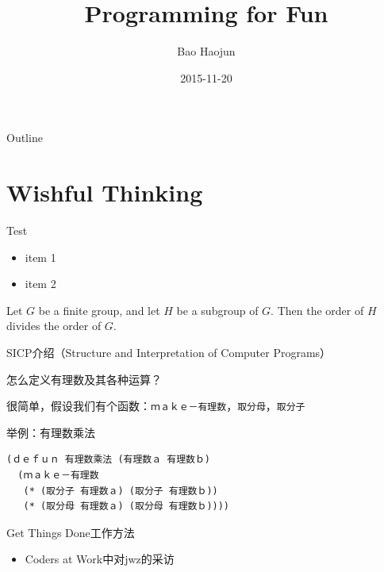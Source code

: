 \documentclass[presentation,dvipdfmx,CJKbookmarks]{beamer}
\author{Bao Haojun}
\date{2015-11-20}
\title{Programming for Fun}
\begin{document}
\begin{CJK*}{UTF8}{simsun}

\maketitle
\begin{frame}{Outline}
\tableofcontents
\end{frame}

\CJKtilde

\section{Wishful Thinking}
\label{sec:orgaee6256}

\begin{frame}[label={sec:orgc4fc2a6}]{Test}
\begin{itemize}[<+->]
\item item 1
\item item 2
\end{itemize}

Let \(G\) be a finite group, and let \(H\) be
a subgroup of \(G\).  Then the order of \(H\) divides the order of \(G\).
\end{frame}

\begin{frame}[fragile,label={sec:org3841833}]{SICP\thinspace 介绍（Structure and Interpretation of Computer Programs）}
 \begin{block}{怎么定义有理数及其各种运算？}
\end{block}
\begin{block}{很简单，假设我们有\thinspace 个函数：\texttt{ｍａｋｅ－有理数}，\texttt{取分母}，\texttt{取分子}}
\end{block}
\begin{block}{举例：有理数乘法}
\begin{verbatim}
(ｄｅｆｕｎ 有理数乘法 (有理数ａ 有理数ｂ)
  (ｍａｋｅ－有理数
   (* (取分子 有理数ａ) (取分子 有理数ｂ))
   (* (取分母 有理数ａ) (取分母 有理数ｂ))))
\end{verbatim}
\end{block}
\end{frame}

\begin{frame}[label={sec:org264a68c}]{Get Things Done\thinspace 工作方法}
\begin{itemize}
\item Coders at Work\thinspace 中对\thinspace jwz\thinspace 的采访


\end{itemize}
\end{frame}
\end{CJK*}
\end{document}
